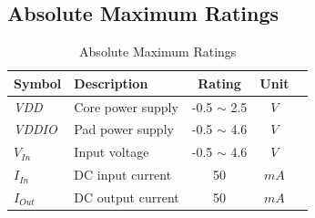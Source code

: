 \subsection{Absolute Maximum Ratings}

 \begin{table}[ht]
 \caption[Absolute Maximum Ratings]{Absolute Maximum Ratings \cite{faraday}}
 \label{tab:elect_rec}
\centering\begin{tabularx}{\textwidth}{|l|X|c|c|c|} \hline
Symbol & Description & Rating & Unit \\ \hline
\textit{VDD} & Core power supply & -0.5 $\sim$ 2.5 & $V$ \\ \hline
\textit{VDDIO} & Pad power supply & -0.5 $\sim$ 4.6 & $V$ \\ \hline
$V_{In}$ & Input voltage &  -0.5 $\sim$ 4.6 & $V$ \\ \hline
$I_{In}$ & DC input current & 50 & $mA$ \\ \hline
$I_{Out}$ & DC output current & 50 & $mA$ \\ \hline
 \end{tabularx}
 \end{table}

